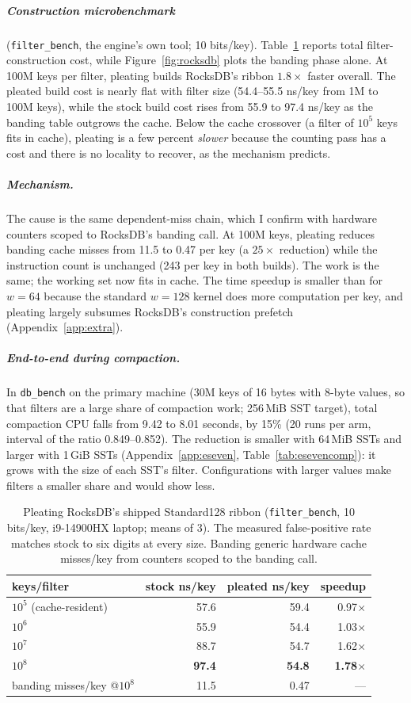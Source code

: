 \documentclass[a4paper,UKenglish,cleveref,autoref,thm-restate,anonymous]{lipics-v2021}
\begin{document}
\subparagraph*{Construction microbenchmark} (\texttt{filter\_bench}, the engine's own tool; 10 bits/key).
Table~\ref{tab:rocksdb} reports total filter-construction cost, while Figure~\ref{fig:rocksdb}
plots the banding phase alone. At 100M keys per filter, pleating builds RocksDB's ribbon
$1.8\times$ faster overall. The pleated build cost is nearly flat with filter size (54.4--55.5 ns/key
from 1M to 100M keys), while the stock build cost rises from 55.9 to
97.4 ns/key as the banding table outgrows the cache. Below the cache crossover (a filter of $10^5$ keys
fits in cache), pleating is a few percent \emph{slower} because the counting pass has a cost and
there is no locality to recover, as the mechanism predicts.

\subparagraph*{Mechanism.} The cause is the same dependent-miss chain, which I confirm with hardware
counters scoped to RocksDB's banding call. At 100M keys, pleating reduces banding cache misses from
11.5 to 0.47 per key (a $25\times$ reduction) while the instruction count is unchanged (243 per
key in both builds). The work is the same; the working set now fits
in cache. The time speedup is smaller than for $w=64$ because the standard $w=128$ kernel does more computation per key, and pleating largely subsumes RocksDB's construction prefetch (Appendix~\ref{app:extra}).

\subparagraph*{End-to-end during compaction.} In \texttt{db\_bench} on the primary machine (30M keys
of 16 bytes with 8-byte values, so that filters are a large share of compaction work; 256\,MiB
SST target), total compaction CPU falls from 9.42 to 8.01 seconds,
by 15\% (20 runs per arm, interval of the ratio
0.849--0.852). The reduction is smaller with 64\,MiB SSTs and larger with 1\,GiB SSTs
(Appendix~\ref{app:eseven}, Table~\ref{tab:esevencomp}): it grows with the size of each SST's
filter. Configurations with larger values make filters a smaller share and would show less.

\begin{table}
\caption{Pleating RocksDB's shipped Standard128 ribbon (\texttt{filter\_bench}, 10 bits/key,
 i9-14900HX laptop; means of 3). The measured false-positive rate matches stock to six digits at every size.
Banding generic hardware cache misses/key from counters scoped to the banding call.}
\label{tab:rocksdb}
\begin{tabular}{lrrr}
\toprule
keys/filter & stock ns/key & pleated ns/key & speedup \\
\midrule
$10^5$ (cache-resident) & 57.6 & 59.4 & 0.97$\times$ \\
$10^6$                  & 55.9 & 54.4 & 1.03$\times$ \\
$10^7$                  & 88.7 & 54.7 & 1.62$\times$ \\
$10^8$                  & \textbf{97.4} & \textbf{54.8} & \textbf{1.78$\times$} \\
\midrule
banding misses/key @$10^8$ & 11.5 & 0.47 & --- \\
\bottomrule
\end{tabular}
\end{table}
\end{document}
